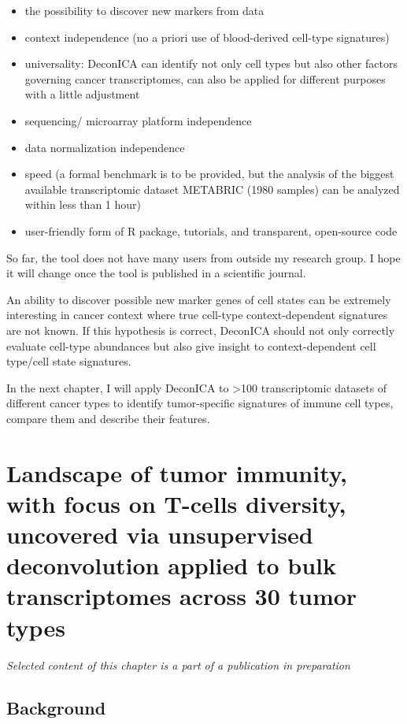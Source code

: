 \documentclass[12pt,]{book}
\providecommand{\tightlist}{%
  \setlength{\itemsep}{0pt}\setlength{\parskip}{0pt}}
\theoremstyle{definition}
\theoremstyle{definition}
\theoremstyle{definition}
\theoremstyle{remark}
\begin{document}
\begin{itemize}
\tightlist
\item
  the possibility to discover new markers from data
\item
  context independence (no a priori use of blood-derived cell-type
  signatures)
\item
  universality: DeconICA can identify not only cell types but also other
  factors governing cancer transcriptomes, can also be applied for
  different purposes with a little adjustment
\item
  sequencing/ microarray platform independence
\item
  data normalization independence
\item
  speed (a formal benchmark is to be provided, but the analysis of the
  biggest available transcriptomic dataset METABRIC (1980 samples) can
  be analyzed within less than 1 hour)
\item
  user-friendly form of R package, tutorials, and transparent,
  open-source code
\end{itemize}

So far, the tool does not have many users from outside my research
group. I hope it will change once the tool is published in a scientific
journal.

An ability to discover possible new marker genes of cell states can be
extremely interesting in cancer context where true cell-type
context-dependent signatures are not known. If this hypothesis is
correct, DeconICA should not only correctly evaluate cell-type
abundances but also give insight to context-dependent cell type/cell
state signatures.

In the next chapter, I will apply DeconICA to \textgreater{}100
transcriptomic datasets of different cancer types to identify
tumor-specific signatures of immune cell types, compare them and
describe their features.

\hypertarget{results}{%
\chapter{Landscape of tumor immunity, with focus on T-cells diversity,
uncovered via unsupervised deconvolution applied to bulk transcriptomes
across 30 tumor types}\label{results}}

\emph{Selected content of this chapter is a part of a publication in
preparation}


\hypertarget{background}{%
\section{Background}\label{background}}
\end{document}
